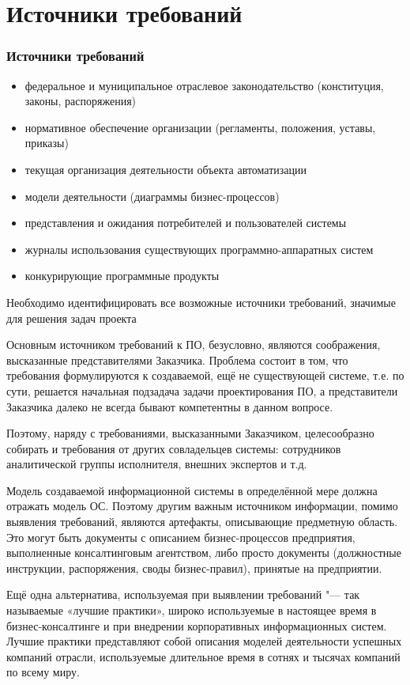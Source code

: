\documentclass{../industrial-development}
\begin{document}
\section{Источники требований}
\begin{frame} \frametitle{Источники требований}
 \begin{itemize}
\item федеральное и муниципальное отраслевое законодательство (конституция, законы, распоряжения)
\item нормативное обеспечение организации (регламенты, положения, уставы, приказы)
\item текущая организация деятельности объекта автоматизации
\item модели деятельности (диаграммы бизнес-процессов)
\item представления и ожидания потребителей и пользователей системы
\item журналы использования существующих программно-аппаратных систем
\item конкурирующие программные продукты
  \end{itemize}
Необходимо идентифицировать все возможные источники требований, значимые для решения задач проекта
\end{frame}

\lecturenotes

Основным источником требований к ПО, безусловно, являются соображения, высказанные представителями Заказчика. Проблема состоит в том, что требования формулируются к создаваемой, ещё не существующей системе, т.е. по сути, решается начальная подзадача задачи проектирования ПО, а представители Заказчика далеко не всегда бывают компетентны в данном вопросе. 

Поэтому, наряду с требованиями, высказанными Заказчиком, целесообразно собирать и требования от других совладельцев системы: сотрудников аналитической группы исполнителя, внешних экспертов и т.д.

Модель создаваемой информационной системы в определённой мере должна отражать модель ОС. Поэтому другим важным источником информации, помимо выявления требований, являются артефакты, описывающие предметную область. Это могут быть документы с описанием бизнес-процессов предприятия, выполненные консалтинговым агентством, либо просто документы (должностные инструкции, распоряжения, своды бизнес-правил), принятые на предприятии.

Ещё одна альтернатива, используемая при выявлении требований "--- так называемые «лучшие практики», широко используемые в настоящее время в бизнес-консалтинге и при внедрении корпоративных информационных систем. Лучшие практики представляют собой описания моделей деятельности успешных компаний отрасли, используемые длительное время в сотнях и тысячах компаний по всему миру.
\end{document}

